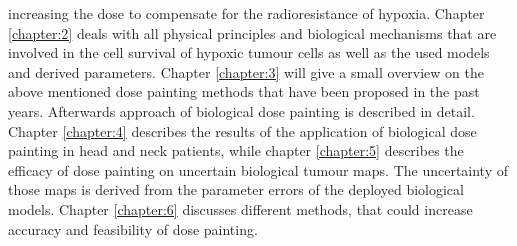 increasing the dose to compensate for the radioresistance of hypoxia. Chapter \ref{chapter:2} deals with all physical principles and biological mechanisms that are involved in the cell survival of hypoxic tumour cells as well as the used models and derived parameters. Chapter \ref{chapter:3} will give a small overview on the above mentioned dose painting methods that have been proposed in the past years. Afterwards approach of biological dose painting is described in detail. Chapter \ref{chapter:4} describes the results of the application of biological dose painting in head and neck patients, while chapter \ref{chapter:5} describes the efficacy of dose painting on uncertain biological tumour maps. The uncertainty of those maps is derived from the parameter errors of the deployed biological models. Chapter \ref{chapter:6} discusses different methods, that could increase accuracy and feasibility of dose painting.